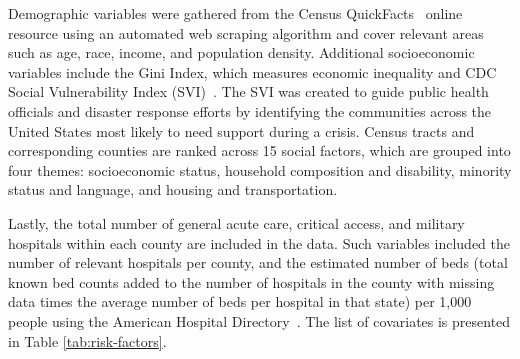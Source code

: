 \documentclass[a4paper, inpress]{jds} %
\renewcommand{\_}{%
    \textunderscore\hspace{0pt}%
}
\begin{document}
Demographic variables were gathered from the Census
QuickFacts~\citep{www-census} online resource using an automated web
scraping algorithm and cover relevant areas such as age, race, income,
and population density. Additional socioeconomic variables include the
Gini Index, which measures economic inequality and CDC Social
Vulnerability Index (SVI)~\citep{www-cdc-svi}. The SVI was created to
guide public health officials and disaster response efforts by
identifying the communities across the United States most likely to
need support during a crisis. Census tracts and corresponding counties
are ranked across 15 social factors, which are grouped into four
themes: socioeconomic status, household composition and disability,
minority status and language, and housing and transportation.

Lastly, the total number of general acute care, critical access, and
military hospitals within each county are included in the data. Such
variables included the number of relevant hospitals per county, and
the estimated number of beds (total known bed counts added to the
number of hospitals in the county with missing data times the average
number of beds per hospital in that state) per 1,000 people using the
American Hospital Directory~\citep{www-ahd}.
The list of covariates is presented in Table \ref{tab:risk-factors}.
\end{document}
